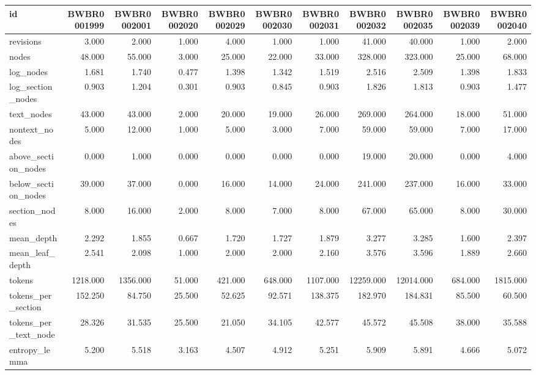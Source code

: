 \begin{tabular}{lrrrrrrrrrr}
\toprule
id & BWBR0001999 & BWBR0002001 & BWBR0002020 & BWBR0002029 & BWBR0002030 & BWBR0002031 & BWBR0002032 & BWBR0002035 & BWBR0002039 & BWBR0002040 \\
\midrule
revisions & 3.000 & 2.000 & 1.000 & 4.000 & 1.000 & 1.000 & 41.000 & 40.000 & 1.000 & 2.000 \\
\cline{1-11}
nodes & 48.000 & 55.000 & 3.000 & 25.000 & 22.000 & 33.000 & 328.000 & 323.000 & 25.000 & 68.000 \\
\cline{1-11}
log\_nodes & 1.681 & 1.740 & 0.477 & 1.398 & 1.342 & 1.519 & 2.516 & 2.509 & 1.398 & 1.833 \\
\cline{1-11}
log\_section\_nodes & 0.903 & 1.204 & 0.301 & 0.903 & 0.845 & 0.903 & 1.826 & 1.813 & 0.903 & 1.477 \\
\cline{1-11}
text\_nodes & 43.000 & 43.000 & 2.000 & 20.000 & 19.000 & 26.000 & 269.000 & 264.000 & 18.000 & 51.000 \\
\cline{1-11}
nontext\_nodes & 5.000 & 12.000 & 1.000 & 5.000 & 3.000 & 7.000 & 59.000 & 59.000 & 7.000 & 17.000 \\
\cline{1-11}
above\_section\_nodes & 0.000 & 1.000 & 0.000 & 0.000 & 0.000 & 0.000 & 19.000 & 20.000 & 0.000 & 4.000 \\
\cline{1-11}
below\_section\_nodes & 39.000 & 37.000 & 0.000 & 16.000 & 14.000 & 24.000 & 241.000 & 237.000 & 16.000 & 33.000 \\
\cline{1-11}
section\_nodes & 8.000 & 16.000 & 2.000 & 8.000 & 7.000 & 8.000 & 67.000 & 65.000 & 8.000 & 30.000 \\
\cline{1-11}
mean\_depth & 2.292 & 1.855 & 0.667 & 1.720 & 1.727 & 1.879 & 3.277 & 3.285 & 1.600 & 2.397 \\
\cline{1-11}
mean\_leaf\_depth & 2.541 & 2.098 & 1.000 & 2.000 & 2.000 & 2.160 & 3.576 & 3.596 & 1.889 & 2.660 \\
\cline{1-11}
tokens & 1218.000 & 1356.000 & 51.000 & 421.000 & 648.000 & 1107.000 & 12259.000 & 12014.000 & 684.000 & 1815.000 \\
\cline{1-11}
tokens\_per\_section & 152.250 & 84.750 & 25.500 & 52.625 & 92.571 & 138.375 & 182.970 & 184.831 & 85.500 & 60.500 \\
\cline{1-11}
tokens\_per\_text\_node & 28.326 & 31.535 & 25.500 & 21.050 & 34.105 & 42.577 & 45.572 & 45.508 & 38.000 & 35.588 \\
\cline{1-11}
entropy\_lemma & 5.200 & 5.518 & 3.163 & 4.507 & 4.912 & 5.251 & 5.909 & 5.891 & 4.666 & 5.072 \\

\end{tabular}
